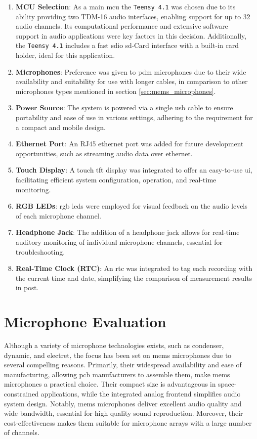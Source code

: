 \begin{enumerate}
	\item \textbf{MCU Selection}: As a main \acrfull{mcu} the \texttt{Teensy 4.1} was chosen due to its ability providing two TDM-16 audio interfaces, enabling support for up to 32 audio channels.
	      Its computational performance and extensive software support in audio applications were key factors in this decision.
	      Additionally, the \texttt{Teensy 4.1} includes a fast \acrshort{sdio} \acrshort{sd}-Card interface with a built-in card holder, ideal for this application.
	\item \textbf{Microphones}: Preference was given to \acrshort{pdm} microphones due to their wide availability and suitability for use with longer cables, in comparison to other microphones types mentioned in section \ref{sec:mems_microphones}.
	\item \textbf{Power Source}: The system is powered via a single \acrshort{usb} cable to ensure portability and ease of use in various settings, adhering to the requirement for a compact and mobile design.
	\item \textbf{Ethernet Port}: An RJ45 ethernet port was added for future development opportunities, such as streaming audio data over ethernet.
	\item \textbf{Touch Display}: A touch \acrshort{tft} display was integrated to offer an easy-to-use \acrshort{ui}, facilitating efficient system configuration, operation, and real-time monitoring.
	\item \textbf{RGB LEDs}: \acrshort{rgb} \acrshort{led}s were employed for visual feedback on the audio levels of each microphone channel.
	\item \textbf{Headphone Jack}: The addition of a headphone jack allows for real-time auditory monitoring of individual microphone channels, essential for troubleshooting.
	\item \textbf{Real-Time Clock (RTC)}: An \acrshort{rtc} was integrated to tag each recording with the current time and date, simplifying the comparison of measurement results in post.
\end{enumerate}


\newpage
\section{Microphone Evaluation}
\label{sec:microphone_evaluation}
Although a variety of microphone technologies exists, such as condenser, dynamic, and electret, the focus has been set on \acrshort{mems} microphones due to several compelling reasons.
Primarily, their widespread availability and ease of manufacturing, allowing \acrshort{pcb} manufacturers to assemble them, make \acrshort{mems} microphones a practical choice.
Their compact size is advantageous in space-constrained applications, while the integrated analog frontend simplifies audio system design.
Notably, \acrshort{mems} microphones deliver excellent audio quality and wide bandwidth, essential for high quality sound reproduction.
Moreover, their cost-effectiveness makes them suitable for microphone arrays with a large number of channels.

